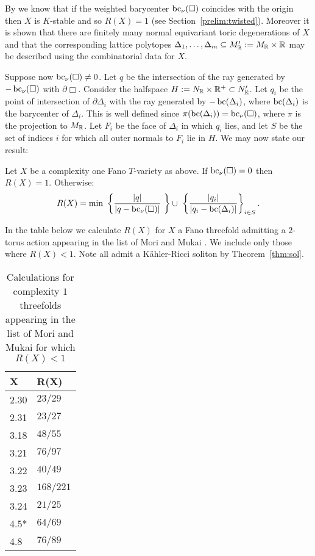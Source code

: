 By \cite{ilten2015} we know that if the weighted barycenter \(\mathop{\rm bc}\nolimits_\nu(\Box)\) coincides with the origin then \(X\) is \(K\)-stable and so \(R(X) = 1\) (see Section~\ref{prelim:twisted}). Moreover it is shown that there are finitely many normal equivariant toric degenerations of \(X\) and that the corresponding lattice polytopes \(\Delta_1,\dots,\Delta_m \subseteq M'_{\mathbb{R}} := M_{\mathbb{R}} \times \mathbb{R}\) may be described using the combinatorial data for \(X\).

Suppose now \(\mathop{\rm bc}\nolimits_\nu(\Box) \neq 0\). Let \(q\) be the intersection of the ray generated by \(-\mathop{\rm bc}\nolimits_\nu(\Box)\) with \(\partial \Box\). Consider the halfspace \(H := N_{\mathbb{R}} \times \mathbb{R}^+ \subset N'_{\mathbb{R}}\). Let \(q_i\) be the point of intersection of \(\partial \Delta_i\) with the ray generated by \(-\mathop{\rm bc}\nolimits(\Delta_i)\), where \(\mathop{\rm bc}\nolimits(\Delta_i)\) is the barycenter of \(\Delta_i\). This is well defined since \(\pi(\mathop{\rm bc}\nolimits(\Delta_i)) = \mathop{\rm bc}\nolimits_\nu(\Box)\), where \(\pi\) is the projection to \(M_{\mathbb{R}}\). Let \(F_i\) be  the face of \(\Delta_i\) in which \(q_i\) lies, and let \(S\) be the set of indices \(i\) for which all outer normals to \(F_i\) lie in \(H\). We may now state our result:
\begin{theorem} \label{thm:R(X)} Let \(X\) be a complexity one Fano \(T\)-variety as above. If \(\mathop{\rm bc}\nolimits_\nu(\Box) = 0\) then \(R(X) = 1\). Otherwise:
\[
R(X) = \min \  \left\lbrace \frac{|q|}{|q-\mathop{\rm bc}\nolimits_\nu(\Box)|}  \ \right\rbrace \cup \ \left\lbrace \frac{|q_i|}{|q_i - \mathop{\rm bc}\nolimits(\Delta_i)|} \right\rbrace_{i \in S} .
\]
\end{theorem}
\begin{corollary} \label{cor:R(X)}
In the table below we calculate \(R(X)\) for \(X\) a Fano threefold  admitting a \(2\)-torus action appearing in the list of Mori and Mukai \cite{mori1981classification}. We include only those where \(R(X) <1\). Note all admit a K\"ahler-Ricci soliton by Theorem~\ref{thm:sol}.
\end{corollary}
\begin{table}[h] \centering
\captionsetup{width=.95\linewidth}
\caption{Calculations for complexity \(1\) threefolds appearing in the list of Mori and Mukai for which \(R(X) <1\)}
\begin{tabular}{l l}
\hline
X & R(X) \\
\hline
2.30 & \(23/29\) \\
2.31 & \(23/27\) \\
3.18 & \(48/55\) \\
3.21 & \(76/97\) \\
3.22 & \(40/49\) \\
3.23 & \(168/221\) \\
3.24 & \(21/25\) \\
4.5* & \(64/69\) \\
4.8 & \(76/89\) \\
\hline
\end{tabular}
\label{table:name}
\end{table}

